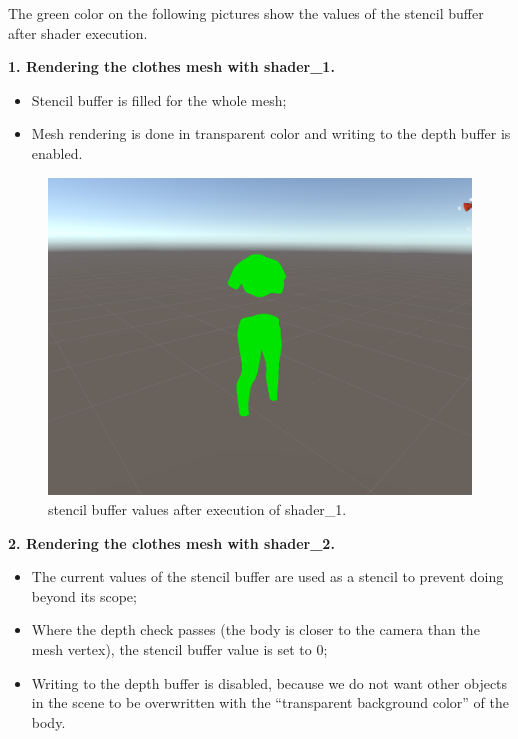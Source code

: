 \documentclass[a4paper]{report}
\begin{document}
The green color on the following pictures show the values of the stencil buffer after shader execution.



\textbf{1. Rendering the clothes mesh with shader\_1.}
\begin{itemize}
    \item Stencil buffer is filled for the whole mesh;
    \item Mesh rendering is done in transparent color and writing to the depth buffer is enabled.
\end{itemize}

 \begin{figure}[H]
  \includegraphics[width=\textwidth, keepaspectratio]{images/ClothesDemos/Screenshot 2021-05-08 175145.png}
  \caption{stencil buffer values after execution of shader\_1.} 
  \label{fig:stencil_sh_1}
\end{figure}


\textbf{2. Rendering the clothes mesh with shader\_2.}

\begin{itemize}
    \item The current values of the stencil buffer are used as a stencil to prevent doing beyond its scope;
    \item Where the depth check passes (the body is closer to the camera than the mesh vertex), the stencil buffer value is set to 0;
    \item Writing to the depth buffer is disabled, because we do not want other objects in the scene to be overwritten with the “transparent background color” of the body.
\end{itemize}
\end{document}
